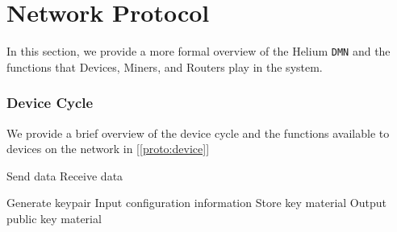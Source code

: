 \documentclass[UTF8, 10pt, nonatbib, nocopyrightspace, reprint]{sigplanconf}
\newenvironment{protocol}[2]{
  \begin{algorithm}[!htb]
    \DontPrintSemicolon
    \caption{#1}\label{#2}
}{
  \end{algorithm}
  \FloatBarrier
}
\newcommand{\protoref}[1]{[\autoref{#1}]}
\begin{document}
\section{Network Protocol}

In this section, we provide a more formal overview of the Helium \verb|DMN| and the functions that Devices, Miners, and Routers play in the system.

\subsubsection{Device Cycle}

We provide a brief overview of the device cycle and the functions available to devices on the network in \protoref{proto:device}

\begin{protocol}{Device Protocol Overview}{proto:device}

   {
    Send data \;
    Receive data \;
  }

   {
    Generate keypair \;
    Input configuration information \;
    Store key material \;
    Output public key material \;
  }
\end{protocol}
\end{document}
